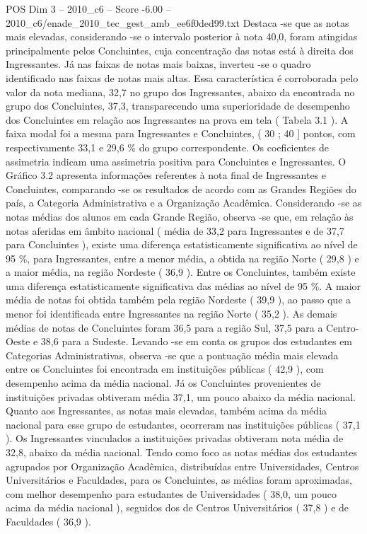 \begin{textsample}{POS Dim 3 – 2010\_c6 – Score -6.00 – 2010\_c6/enade\_2010\_tec\_gest\_amb\_ee6f0ded99.txt}
Destaca -se que as notas mais elevadas, considerando -se o intervalo posterior à nota 40,0, foram atingidas principalmente pelos Concluintes, cuja concentração das notas está à direita dos Ingressantes.
Já nas faixas de notas mais baixas, inverteu -se o quadro identificado nas faixas de notas mais altas.
Essa característica é corroborada pelo valor da nota mediana, 32,7 no grupo dos Ingressantes, abaixo da encontrada no grupo dos Concluintes, 37,3, transparecendo uma superioridade de desempenho dos Concluintes em relação aos Ingressantes na prova em tela ( Tabela 3.1 ).
A faixa modal foi a mesma para Ingressantes e Concluintes, ( 30 ; 40 ] pontos, com respectivamente 33,1 e 29,6 \% do grupo correspondente.
Os coeficientes de assimetria indicam uma assimetria positiva para Concluintes e Ingressantes.
O Gráfico 3.2 apresenta informações referentes à nota final de Ingressantes e Concluintes, comparando -se os resultados de acordo com as Grandes Regiões do país, a Categoria Administrativa e a Organização Acadêmica.
Considerando -se as notas médias dos alunos em cada Grande Região, observa -se que, em relação às notas aferidas em âmbito nacional ( média de 33,2 para Ingressantes e de 37,7 para Concluintes ), existe uma diferença estatisticamente significativa ao nível de 95 \%, para Ingressantes, entre a menor média, a obtida na região Norte ( 29,8 ) e a maior média, na região Nordeste ( 36,9 ).
Entre os Concluintes, também existe uma diferença estatisticamente significativa das médias ao nível de 95 \%.
A maior média de notas foi obtida também pela região Nordeste ( 39,9 ), ao passo que a menor foi identificada entre Ingressantes na região Norte ( 35,2 ).
As demais médias de notas de Concluintes foram 36,5 para a região Sul, 37,5 para a Centro-Oeste e 38,6 para a Sudeste.
Levando -se em conta os grupos dos estudantes em Categorias Administrativas, observa -se que a pontuação média mais elevada entre os Concluintes foi encontrada em instituições públicas ( 42,9 ), com desempenho acima da média nacional.
Já os Concluintes provenientes de instituições privadas obtiveram média 37,1, um pouco abaixo da média nacional.
Quanto aos Ingressantes, as notas mais elevadas, também acima da média nacional para esse grupo de estudantes, ocorreram nas instituições públicas ( 37,1 ).
Os Ingressantes vinculados a instituições privadas obtiveram nota média de 32,8, abaixo da média nacional.
Tendo como foco as notas médias dos estudantes agrupados por Organização Acadêmica, distribuídas entre Universidades, Centros Universitários e Faculdades, para os Concluintes, as médias foram aproximadas, com melhor desempenho para estudantes de Universidades ( 38,0, um pouco acima da média nacional ), seguidos dos de Centros Universitários ( 37,8 ) e de Faculdades ( 36,9 ).

\end{textsample}
